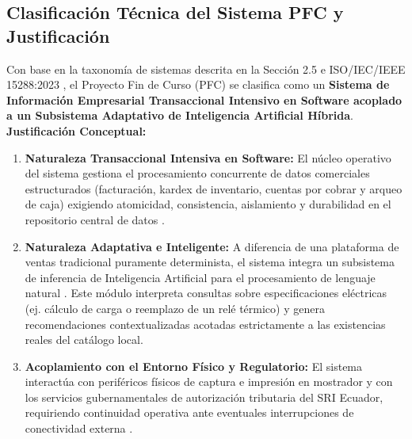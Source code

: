 \documentclass[conference,10pt]{IEEEtran}
\begin{document}
	\subsection{Clasificación Técnica del Sistema PFC y Justificación}
	Con base en la taxonomía de sistemas descrita en la Sección 2.5 e ISO/IEC/IEEE 15288:2023 \cite{ieee15288, pohl2025}, el Proyecto Fin de Curso (PFC) se clasifica como un \textbf{Sistema de Información Empresarial Transaccional Intensivo en Software acoplado a un Subsistema Adaptativo de Inteligencia Artificial Híbrida}.
	\textbf{Justificación Conceptual:}
	\begin{enumerate}
		\item \textbf{Naturaleza Transaccional Intensiva en Software:} El núcleo operativo del sistema gestiona el procesamiento concurrente de datos comerciales estructurados (facturación, kardex de inventario, cuentas por cobrar y arqueo de caja) exigiendo atomicidad, consistencia, aislamiento y durabilidad en el repositorio central de datos \cite{ieee12207, swebok2024}.
		\item \textbf{Naturaleza Adaptativa e Inteligente:} A diferencia de una plataforma de ventas tradicional puramente determinista, el sistema integra un subsistema de inferencia de Inteligencia Artificial para el procesamiento de lenguaje natural \cite{pohl2025}. Este módulo interpreta consultas sobre especificaciones eléctricas (ej. cálculo de carga o reemplazo de un relé térmico) y genera recomendaciones contextualizadas acotadas estrictamente a las existencias reales del catálogo local.
		\item \textbf{Acoplamiento con el Entorno Físico y Regulatorio:} El sistema interactúa con periféricos físicos de captura e impresión en mostrador y con los servicios gubernamentales de autorización tributaria del SRI Ecuador, requiriendo continuidad operativa ante eventuales interrupciones de conectividad externa \cite{iso25010}.
	\end{enumerate}
\end{document}
